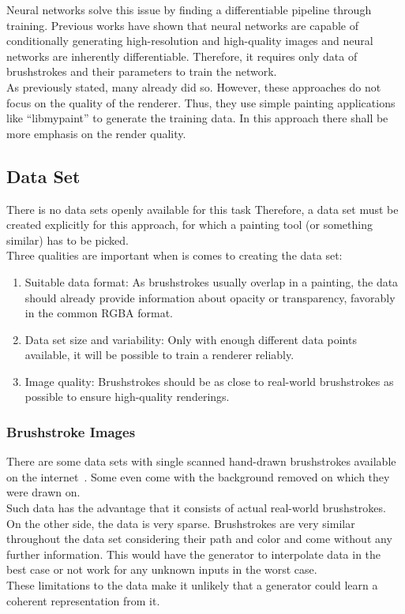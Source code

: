 Neural networks solve this issue by finding a differentiable pipeline through training.
Previous works have shown that neural networks are capable of conditionally generating high-resolution and high-quality images and neural networks are inherently differentiable.
Therefore, it requires only data of brushstrokes and their parameters to train the network.\\
As previously stated, many already did so.
However, these approaches do not focus on the quality of the renderer.
Thus, they use simple painting applications like ``libmypaint'' to generate the training data.
In this approach there shall be more emphasis on the render quality.

\subsection{Data Set}
There is no data sets openly available for this task
Therefore, a data set must be created explicitly for this approach, for which a painting tool (or something similar) has to be picked.\\
Three qualities are important when is comes to creating the data set:
\begin{enumerate}
    \item Suitable data format: As brushstrokes usually overlap in a painting, the data should already provide information about opacity or transparency, favorably in the common RGBA format.
    \item Data set size and variability: Only with enough different data points available, it will be possible to train a renderer reliably.
    \item Image quality: Brushstrokes should be as close to real-world brushstrokes as possible to ensure high-quality renderings.
\end{enumerate}

\subsubsection{Brushstroke Images}
There are some data sets with single scanned hand-drawn brushstrokes available on the internet~\cite{zolee}.
Some even come with the background removed on which they were drawn on.\\
Such data has the advantage that it consists of actual real-world brushstrokes.
On the other side, the data is very sparse.
Brushstrokes are very similar throughout the data set considering their path and color and come without any further information.
This would have the generator to interpolate data in the best case or not work for any unknown inputs in the worst case.\\
These limitations to the data make it unlikely that a generator could learn a coherent representation from it.

